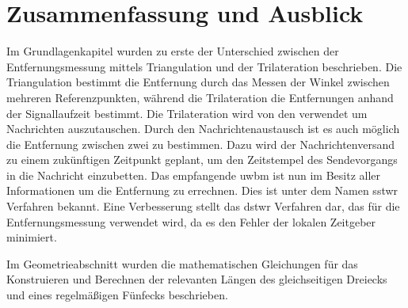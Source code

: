 %
%	
%	
%
\chapter{Zusammenfassung und Ausblick}

Im Grundlagenkapitel wurden zu erste der Unterschied zwischen der Entfernungsmessung mittels Triangulation und der Trilateration beschrieben. Die Triangulation bestimmt die Entfernung durch das Messen der Winkel zwischen mehreren Referenzpunkten, während die Trilateration die Entfernungen anhand der Signallaufzeit bestimmt. Die Trilateration wird von den  verwendet um Nachrichten auszutauschen. Durch den Nachrichtenaustausch ist es auch möglich die Entfernung zwischen zwei  zu bestimmen. Dazu wird der Nachrichtenversand zu einem zukünftigen Zeitpunkt geplant, um den Zeitstempel des Sendevorgangs in die Nachricht einzubetten. Das empfangende \gls{uwbm} ist nun im Besitz aller Informationen um die Entfernung zu errechnen. Dies ist unter dem Namen \gls{sstwr} Verfahren bekannt. Eine Verbesserung stellt das \gls{dstwr} Verfahren dar, das für die Entfernungsmessung verwendet wird, da es den Fehler der lokalen Zeitgeber minimiert.

Im Geometrieabschnitt wurden die mathematischen Gleichungen für das Konstruieren und Berechnen der relevanten Längen des gleichseitigen Dreiecks und eines regelmäßigen Fünfecks beschrieben.

